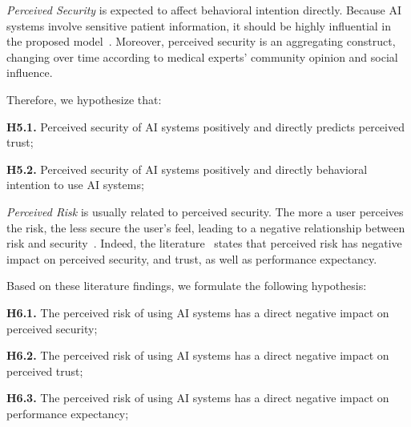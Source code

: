 \vspace{2.00mm}

{\it Perceived Security} is expected to affect behavioral intention directly.
Because \ac{AI} systems involve sensitive patient information, it should be highly influential in the proposed model~\cite{KHALILZADEH2017460}.
Moreover, perceived security is an aggregating construct, changing over time according to medical experts' community opinion and social influence.

\vspace{2.00mm}

\noindent
Therefore, we hypothesize that:

\vspace{2.00mm}

\noindent
{\bf H5.1.} Perceived security of \ac{AI} systems positively and directly predicts perceived trust;

\vspace{2.00mm}

\noindent
{\bf H5.2.} Perceived security of \ac{AI} systems positively and directly behavioral intention to use \ac{AI} systems;

{\it Perceived Risk} is usually related to perceived security.
The more a user perceives the risk, the less secure the user's feel, leading to a negative relationship between risk and security~\cite{KHALILZADEH2017460}.
Indeed, the literature~\cite{10.1145/3132272.3134111, HART201993} states that perceived risk has negative impact on perceived security, and trust, as well as performance expectancy.

\vspace{2.00mm}

\noindent
Based on these literature findings, we formulate the following hypothesis:

\vspace{2.00mm}

\noindent
{\bf H6.1.} The perceived risk of using \ac{AI} systems has a direct negative impact on perceived security;

\vspace{2.00mm}

\noindent
{\bf H6.2.} The perceived risk of using \ac{AI} systems has a direct negative impact on perceived trust;

\vspace{2.00mm}

\noindent
{\bf H6.3.} The perceived risk of using \ac{AI} systems has a direct negative impact on performance expectancy;

